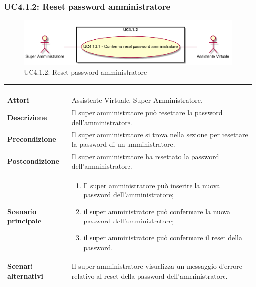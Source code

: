 \newpage\subsubsection{UC4.1.2: Reset password amministratore}
\label{UC4.1.2}
\begin{figure}[h]
\centering
\includegraphics[width=\textwidth,height=\textheight,keepaspectratio]{images/UseCaseUC412.png}
\caption{UC4.1.2: Reset password amministratore}
\end{figure}
\begin{longtable}{l|p{10cm}}
\rowcolor[gray]{0.8} \multicolumn{2}{c}{} \\
\rowcolor[gray]{0.8} \multicolumn{2}{c}{\textbf{UC4.1.2 - Reset password amministratore}} \\
\rowcolor[gray]{0.8} \multicolumn{2}{c}{} \\
\hline
&\\
\textbf{Attori} & Assistente Virtuale, Super Amministratore.\\[7pt]
\textbf{Descrizione} & Il super amministratore può resettare la password dell'amministratore.\\[7pt]
\textbf{Precondizione} & Il super amministratore si trova nella sezione per resettare la password di un amministratore.\\[7pt]
\textbf{Postcondizione} & Il super amministratore ha resettato la password dell'amministratore.\\[7pt]
\textbf{Scenario principale} &\begin{enumerate}
\item  Il super amministratore può inserire la nuova password dell'amministratore;
\item  il super amministratore può confermare la nuova password dell'amministratore;
\item  il super amministratore può confermare il reset della password.
\end{enumerate}
\\[7pt]
\textbf{Scenari alternativi} & Il super amministratore visualizza un messaggio d'errore relativo al reset della password dell'amministratore.\\[7pt]\hline
\end{longtable}

